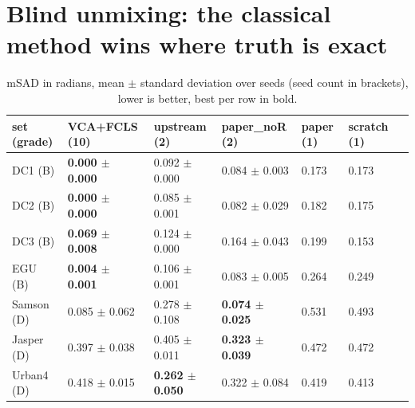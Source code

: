 \section{Blind unmixing: the classical method wins where truth is exact}\label{sec:hslunmix:blind}

\begin{table}[htbp]
\centering\small
\begin{tabular}{@{}lllllll@{}}
\toprule
set (grade) & VCA+FCLS (10) & upstream (2) & paper\_noR (2) & paper (1) & scratch (1) \\
\midrule
DC1 (B) & \textbf{0.000 $\pm$ 0.000} & 0.092 $\pm$ 0.000 & 0.084 $\pm$ 0.003 & 0.173 & 0.173 \\
DC2 (B) & \textbf{0.000 $\pm$ 0.000} & 0.085 $\pm$ 0.001 & 0.082 $\pm$ 0.029 & 0.182 & 0.175 \\
DC3 (B) & \textbf{0.069 $\pm$ 0.008} & 0.124 $\pm$ 0.000 & 0.164 $\pm$ 0.043 & 0.199 & 0.153 \\
EGU (B) & \textbf{0.004 $\pm$ 0.001} & 0.106 $\pm$ 0.001 & 0.083 $\pm$ 0.005 & 0.264 & 0.249 \\
Samson (D) & 0.085 $\pm$ 0.062 & 0.278 $\pm$ 0.108 & \textbf{0.074 $\pm$ 0.025} & 0.531 & 0.493 \\
Jasper (D) & 0.397 $\pm$ 0.038 & 0.405 $\pm$ 0.011 & \textbf{0.323 $\pm$ 0.039} & 0.472 & 0.472 \\
Urban4 (D) & 0.418 $\pm$ 0.015 & \textbf{0.262 $\pm$ 0.050} & 0.322 $\pm$ 0.084 & 0.419 & 0.413 \\
\bottomrule
\end{tabular}
\caption{mSAD in radians, mean $\pm$ standard deviation over seeds (seed count in brackets), lower is better, best per
row in bold.}
\label{tab:hslunmix:msad}
\end{table}

